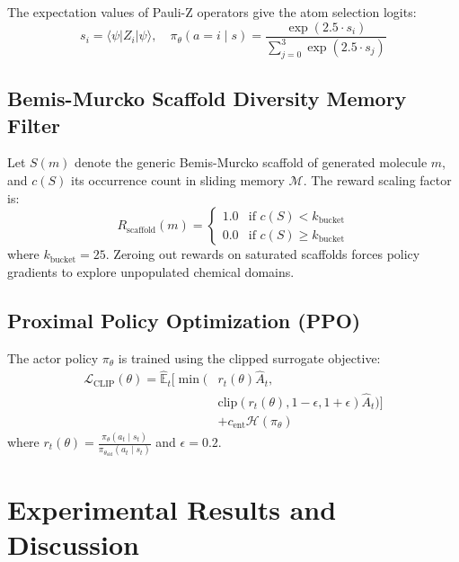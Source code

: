 \documentclass[10pt,twocolumn,a4paper]{article}
\begin{document}
The expectation values of Pauli-Z operators give the atom selection logits:
\begin{equation}
s_i = \langle \psi | Z_i | \psi \rangle, \quad \pi_\theta(a = i \mid s) = \frac{\exp(2.5 \cdot s_i)}{\sum_{j=0}^3 \exp(2.5 \cdot s_j)}
\end{equation}

\subsection{Bemis-Murcko Scaffold Diversity Memory Filter}
Let $S(m)$ denote the generic Bemis-Murcko scaffold of generated molecule $m$, and $c(S)$ its occurrence count in sliding memory $\mathcal{M}$. The reward scaling factor is:
\begin{equation}
R_{\text{scaffold}}(m) = \begin{cases} 1.0 & \text{if } c(S) < k_{\text{bucket}} \\ 0.0 & \text{if } c(S) \ge k_{\text{bucket}} \end{cases}
\end{equation}
where $k_{\text{bucket}} = 25$. Zeroing out rewards on saturated scaffolds forces policy gradients to explore unpopulated chemical domains.

\subsection{Proximal Policy Optimization (PPO)}
The actor policy $\pi_\theta$ is trained using the clipped surrogate objective:
\begin{equation}
\begin{aligned}
\mathcal{L}_{\text{CLIP}}(\theta) = \hat{\mathbb{E}}_t \Big[ \min \big( & r_t(\theta) \hat{A}_t, \\
& \text{clip}(r_t(\theta), 1 - \epsilon, 1 + \epsilon) \hat{A}_t \big) \Big] \\
& + c_{\text{ent}} \mathcal{H}(\pi_\theta)
\end{aligned}
\end{equation}
where $r_t(\theta) = \frac{\pi_\theta(a_t \mid s_t)}{\pi_{\theta_{\text{old}}}(a_t \mid s_t)}$ and $\epsilon = 0.2$.

\section{Experimental Results and Discussion}
\end{document}
